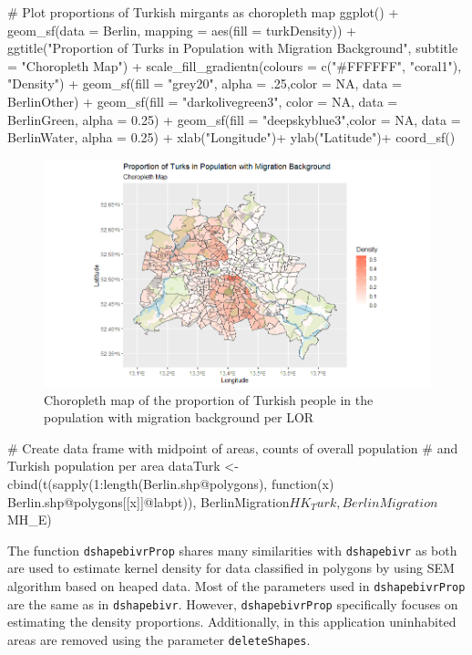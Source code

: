 \begin{example}
    # Plot proportions of Turkish mirgants as choropleth map 
    ggplot() +
      geom_sf(data = Berlin, mapping = aes(fill = turkDensity)) + 
      ggtitle("Proportion of Turks in Population with Migration Background", 
              subtitle = "Choropleth Map") +
      scale_fill_gradientn(colours = c("#FFFFFF", "coral1"), "Density") +
      geom_sf(fill = "grey20", alpha = .25,color = NA, 
                   data = BerlinOther) +
      geom_sf(fill = "darkolivegreen3", color = NA,
                   data = BerlinGreen, alpha = 0.25) +
      geom_sf(fill = "deepskyblue3",color = NA,
                   data = BerlinWater, alpha = 0.25) +
      xlab("Longitude")+ ylab("Latitude")+
      coord_sf()
\end{example}

\begin{figure}[h]
    \centering
    \includegraphics[scale = 0.55]{Figure/Chorophlet_Part2.png}
    \caption{Choropleth map of the proportion of Turkish people in the population with migration background per LOR}
    \label{fig:TurkMigrantsChoropletMap}
\end{figure}


\begin{example}
    # Create data frame with midpoint of areas, counts of overall population 
    # and Turkish population per area
    dataTurk <- cbind(t(sapply(1:length(Berlin.shp@polygons),
                               function(x) Berlin.shp@polygons[[x]]@labpt)),
                      BerlinMigration$HK_Turk, BerlinMigration$MH_E)
\end{example}

The function \texttt{dshapebivrProp} shares many similarities with \texttt{dshapebivr} as both are used to estimate kernel density for data classified in polygons by using SEM algorithm based on heaped data. Most of the parameters used in \texttt{dshapebivrProp} are the same as in \texttt{dshapebivr}. However, \texttt{dshapebivrProp} specifically focuses on estimating the density proportions. Additionally, in this application uninhabited areas are removed using the parameter \texttt{deleteShapes}. 

